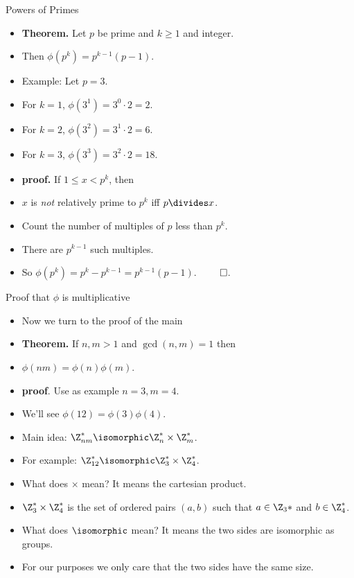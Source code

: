 \documentclass[handout]{beamer}
\begin{document}
\begin{frame}{Powers of Primes}

\begin{itemize}
  \item \textbf{Theorem.} Let $p$ be prime and $k\geq 1$ and integer.
  \item Then $\phi(p^k) = p^{k-1} (p-1)$.
  \item Example: Let $p=3$.
  \item For $k=1$, $\phi(3^1) = 3^0\cdot 2 = 2$.
  \item For $k=2$, $\phi(3^2) = 3^1\cdot 2 = 6$.
  \item For $k=3$, $\phi(3^3) = 3^2\cdot 2 = 18$.
  \item \textbf{proof.} If $1\leq x < p^k$, then
  \item $x$ is \emph{not} relatively prime to $p^k$ iff $p\divides x$.
  \item  Count the number of multiples of $p$ less than $p^k$.
  \item There are $p^{k-1}$ such multiples.
  \item So $\phi(p^k) = p^k - p^{k-1} = p^{k-1}(p-1)$. $\qed$.
\end{itemize}

\end{frame}

\begin{frame}{Proof that $\phi$ is multiplicative}

\begin{itemize}
  \item Now we turn to the proof of the main
  \item \textbf{Theorem.} If $n,m>1$ and $\gcd(n,m)=1$ then
  \item $\phi(nm) = \phi(n)\phi(m)$.
  \item \textbf{proof}. Use as example $n=3, m=4$.
  \item We'll see $\phi(12) = \phi(3)\phi(4)$.
  \item Main idea: $\Z_{nm}^* \isomorphic \Z_n^* \times \Z_m^*$.
  \item For example: $\Z_{12}^* \isomorphic \Z_3^* \times \Z_4^*$.
  \item What does $\times$ mean? It means the cartesian product.
  \item $\Z_3^* \times \Z_4^*$ is the set
  of ordered pairs $(a,b)$ such that $a\in\Z_3*$ and $b\in\Z_4^*$.
  \item What does $\isomorphic$ mean? It means the two sides are isomorphic as groups.
  \item For our purposes we only care that the two sides have the same size.
\end{itemize}

\end{frame}
\end{document}
